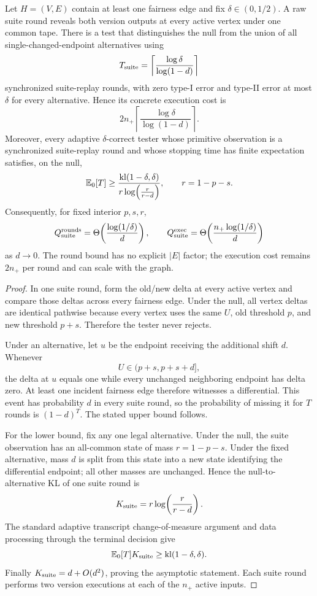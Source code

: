 \begin{theorem}
\label{thm:suite-replay}
Let \(H=(V,E)\) contain at least one fairness edge and fix
\(\delta\in(0,1/2)\).  A raw suite round reveals both version outputs at every
active vertex under one common tape.  There is a test that distinguishes the
null from the union of all single-changed-endpoint alternatives using
\[
T_{\rm suite}
=
\left\lceil
\frac{\log\delta}{\log(1-d)}
\right\rceil
\]
synchronized suite-replay rounds, with zero type-I error and type-II error at
most \(\delta\) for every alternative.  Hence its concrete execution cost is
\[
2n_+
\left\lceil
\frac{\log\delta}{\log(1-d)}
\right\rceil.
\]
Moreover, every adaptive \(\delta\)-correct tester whose primitive observation is
a synchronized suite-replay round and whose stopping time has finite expectation
satisfies, on the null,
\[
\mathbb{E}_0[T]
\ge
\frac{\mathrm{kl}(1-\delta,\delta)}
{r\log\!\left(\frac{r}{r-d}\right)},
\qquad
r=1-p-s.
\]
Consequently, for fixed interior \(p,s,r\),
\[
Q_{\rm suite}^{\rm rounds}
=
\Theta\!\left(\frac{\log(1/\delta)}{d}\right),
\qquad
Q_{\rm suite}^{\rm exec}
=
\Theta\!\left(
\frac{n_+\log(1/\delta)}{d}
\right)
\]
as \(d\to0\).  The round bound has no explicit \(|E|\) factor; the execution
cost remains $2n_+$ per round and can scale with the graph.
\end{theorem}

\begin{proof}
In one suite round, form the old/new delta at every active vertex and compare
those deltas across every fairness edge.  Under the null, all vertex deltas are
identical pathwise because every vertex uses the same \(U\), old threshold
\(p\), and new threshold \(p+s\).  Therefore the tester never rejects.

Under an alternative, let \(u\) be the endpoint receiving the additional shift
\(d\).  Whenever
\[
U\in(p+s,p+s+d],
\]
the delta at \(u\) equals one while every unchanged neighboring endpoint has
delta zero.  At least one incident fairness edge therefore witnesses a
differential.  This event has probability \(d\) in every suite round, so the
probability of missing it for \(T\) rounds is \((1-d)^T\).  The stated upper
bound follows.

For the lower bound, fix any one legal alternative.  Under the null, the suite
observation has an all-common state of mass \(r=1-p-s\).  Under the fixed
alternative, mass \(d\) is split from this state into a new state identifying the
differential endpoint; all other masses are unchanged.  Hence the
null-to-alternative KL of one suite round is
\[
K_{\rm suite}
=
r\log\!\left(\frac{r}{r-d}\right).
\]
The standard adaptive transcript change-of-measure argument and data processing
through the terminal decision give
\[
\mathbb{E}_0[T]K_{\rm suite}
\ge
\mathrm{kl}(1-\delta,\delta).
\]
Finally \(K_{\rm suite}=d+O(d^2)\), proving the asymptotic statement.  Each suite
round performs two version executions at each of the \(n_+\) active inputs.
\end{proof}

